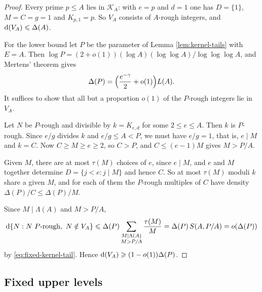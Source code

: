 \documentclass[11pt,letterpaper,reqno]{amsart}
\numberwithin{equation}{section}
\theoremstyle{remark}
\newcommand{\1}{\mathbf 1}
\renewcommand{\leq}{\leqslant}
\renewcommand{\geq}{\geqslant}
\begin{document}
\begin{proof}
Every prime $p\leq A$ lies in $\mathcal{K}_A$: with $e=p$ and $d=1$ one has
$D=\{1\}$, $M=C=g=1$ and $K_{p,1}=p$. So $V_A$ consists of $A$-rough
integers, and $\textup{d}(V_A)\leq\Delta(A)$.

For the lower bound let $P$ be the parameter of
Lemma \ref{lem:kernel-tails} with $E=A$. Then
$\log P=(2+o(1))(\log A)(\log\log A)/\log\log\log A$, and Mertens' theorem gives
\[
 \Delta(P)=\Bigl(\frac{e^{-\gamma}}2+o(1)\Bigr)L(A).
\]
It suffices to show that all but a proportion $o(1)$ of the $P$-rough
integers lie in $V_A$.

Let $N$ be $P$-rough and divisible by $k=K_{e,d}$ for some $2\leq e\leq A$.
Then $k$ is $P$-rough. Since $e/g$ divides $k$ and $e/g\leq A<P$, we must
have $e/g=1$, that is, $e\mid M$ and $k=C$. Now $C\geq M\geq e\geq2$, so
$C>P$, and $C\leq(e-1)M$ gives $M>P/A$.

Given $M$, there are at most $\tau(M)$ choices of $e$, since $e\mid M$, and
$e$ and $M$ together determine $D=\{j<e:j\mid M\}$ and hence $C$. So at
most $\tau(M)$ moduli $k$ share a given $M$, and for each of them the
$P$-rough multiples of $C$ have density $\Delta(P)/C\leq\Delta(P)/M$.

Since $M\mid\Lambda(A)$ and $M>P/A$,
\[
 \textup{d}\{N:N\ \text{$P$-rough},\ N\notin V_A\}
 \leq\Delta(P)\sum_{\substack{M\mid\Lambda(A)\\ M>P/A}}\frac{\tau(M)}M
 =\Delta(P)\,S(A,P/A)=o(\Delta(P))
\]
by \eqref{eq:fixed-kernel-tail}. Hence $\textup{d}(V_A)\geq(1-o(1))\Delta(P)$.
\end{proof}

\subsection{Fixed upper levels}
\end{document}
